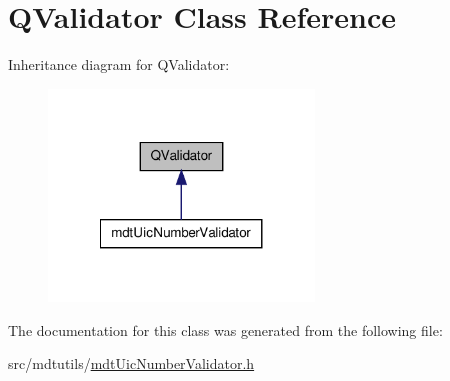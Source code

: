 \hypertarget{class_q_validator}{\section{Q\-Validator Class Reference}
\label{class_q_validator}
}


Inheritance diagram for Q\-Validator\-:\nopagebreak
\begin{figure}[H]
\begin{center}
\leavevmode
\includegraphics[width=200pt]{class_q_validator__inherit__graph}
\end{center}
\end{figure}


The documentation for this class was generated from the following file\-:\begin{DoxyCompactItemize}
\item 
src/mdtutils/\hyperlink{mdt_uic_number_validator_8h}{mdt\-Uic\-Number\-Validator.\-h}\end{DoxyCompactItemize}
